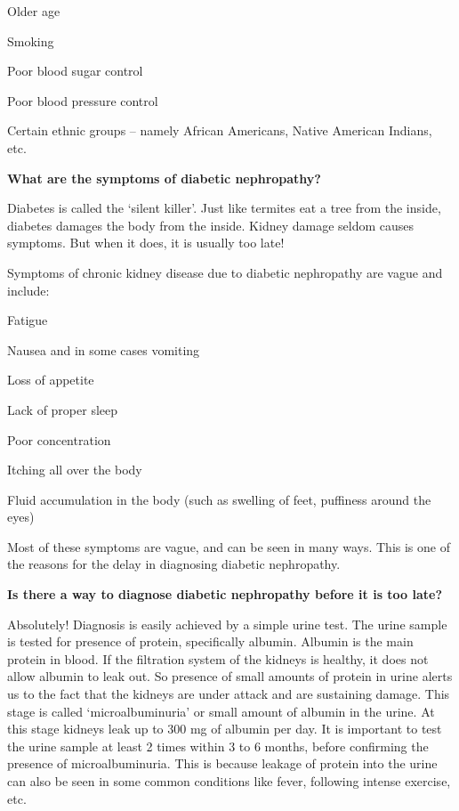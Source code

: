 { \item Older age

 \item Smoking

 \item Poor blood sugar control

 \item Poor blood pressure control

 \item Certain ethnic groups – namely African Americans, Native American Indians, etc.

\textbf{What are the symptoms of diabetic nephropathy?}

Diabetes is called the ‘silent killer’. Just like termites eat a tree from the inside, diabetes damages the body from the inside. Kidney damage seldom causes symptoms. But when it does, it is usually too late!

Symptoms of chronic kidney disease due to diabetic nephropathy are vague and include:

\item Fatigue

 \item Nausea and in some cases vomiting

 \item Loss of appetite

 \item Lack of proper sleep

 \item Poor concentration

 \item Itching all over the body

 \item Fluid accumulation in the body (such as swelling of feet, puffiness around the eyes)

Most of these symptoms are vague, and can be seen in many ways. This is one of the reasons for the delay in diagnosing diabetic nephropathy.

\textbf{Is there a way to diagnose diabetic nephropathy before it is too late?}

Absolutely! Diagnosis is easily achieved by a simple urine test. The urine sample is tested for presence of protein, specifically albumin. Albumin is the main protein in blood. If the filtration system of the kidneys is healthy, it does not allow albumin to leak out. So presence of small amounts of protein in urine alerts us to the fact that the kidneys are under attack and are sustaining damage. This stage is called ‘microalbuminuria’ or small amount of albumin in the urine. At this stage kidneys leak up to 300 mg of albumin per day. It is important to test the urine sample at least 2 times within 3 to 6 months, before confirming the presence of microalbuminuria. This is because leakage of protein into the urine can also be seen in some common conditions like fever, following intense exercise, etc.

}
